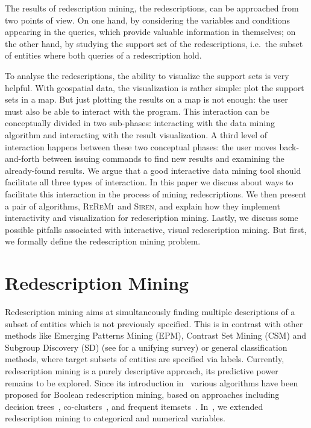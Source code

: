 \documentclass{llncs}
\renewcommand{\note}[1]{{\color{red}{#1}\par}}
\newcommand{\Siren}{\textsc{Siren}}
\newcommand{\ReReMi}{\textsc{ReReMi}}
\begin{document}
The results of redescription mining, the redescriptions, can be
approached from two points of view. On one hand, by considering the
variables and conditions appearing in the queries, which provide
valuable information in themselves; on the other hand, by studying the
support set of the redescriptions, i.e.\ the subset of entities where
both queries of a redescription hold. 
 
\note{I don't think we can have a strict division between visualizing results and
  interacting with the mining algorithm... It could be partly using
  visual means to interact with the mining process (select areas,
  scatter plot with sliders)}

To analyse the
redescriptions, the ability to visualize the support sets is very
helpful. With geospatial data, the visualization is rather simple:
plot the support sets in a map. But just plotting the results on a map
is not enough: the user must also be able to interact with the
program. This interaction can be conceptually divided in two
sub-phases: interacting with the data mining algorithm and interacting
with the result visualization. A third level of interaction happens
between these two conceptual phases: the user moves back-and-forth
between issuing commands to find new results and examining the
already-found results. We argue that a good interactive data mining
tool should facilitate all three types of interaction. In this paper
we discuss about ways to facilitate this interaction in the process of
mining redescriptions. We then present a pair of algorithms, \ReReMi\
and \Siren, and explain how they implement interactivity and
visualization for redescription mining. Lastly, we discuss some
possible pitfalls associated with interactive, visual redescription
mining. But first, we formally define the redescription mining
problem.

\section{Redescription Mining}
\label{sec:redescription-mining}

Redescription mining aims at simultaneously finding multiple
descriptions of a subset of entities which is not previously
specified.  This is in contrast with other methods like Emerging
Patterns Mining (EPM), Contrast Set Mining (CSM) and Subgroup
Discovery (SD) (see \cite{kralj09supervised} for a unifying survey) or
general classification methods, where target subsets of entities are
specified via labels.  Currently, redescription mining is a purely
descriptive approach, its predictive power remains to be explored.
Since its introduction in~\cite{ramakrishnan04turning} various
algorithms have been proposed for Boolean redescription mining, based
on approaches including decision
trees~\cite{ramakrishnan04turning,kumar07redescription},
co-clusters~\cite{parida05redescription}, and frequent
itemsets~\cite{gallo08finding}. In~\cite{galbrun11black}, we extended
redescription mining to categorical and numerical variables.
\end{document}
